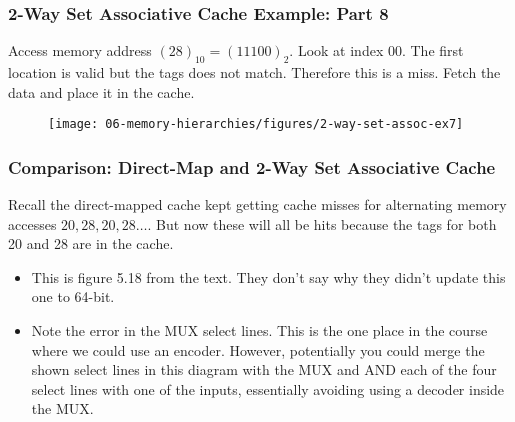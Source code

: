 {%
\begin{frame}\frametitle{2-Way Set Associative Cache Example: Part 8}
Access memory address $(28)_{10}=(11100)_2$. Look at index 00. The first location is valid but the tags does not match. Therefore this is a miss. Fetch the data and place it in the cache.
\begin{figure}[H]
\centering
	{\texttt{[image: 06-memory-hierarchies/figures/2-way-set-assoc-ex7]}}
\end{figure}


\end{frame}
}\fi


\newpage
\begin{frame}\frametitle{Comparison: Direct-Map and 2-Way Set Associative Cache }
Recall the direct-mapped cache kept getting cache misses for alternating memory accesses $20, 28, 20, 28 \dots$. But now these will all be hits because the tags for both 20 and 28 are in the cache. 
\begin{figure}[H]
\centering
\end{figure}


\end{frame}

\newpage
\begin{frame}[fragile]

\BNotes\ifnum{}
\begin{itemize}
\item
  This is figure 5.18 from the text.  They don't say why they didn't update
  this one to 64-bit.
\item Note the error in the MUX select lines.  This is the one place in
	the course where we could use an encoder.  However, potentially you could
	merge the shown select lines in this diagram with the MUX and AND each
	of the four select lines with one of the inputs, essentially avoiding
	using a decoder inside the MUX.
\end{itemize}
\fi\ENotes
\end{frame}

